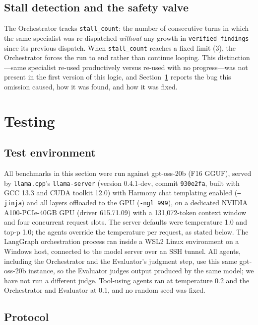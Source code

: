 \documentclass[conference]{IEEEtran}
\begin{document}
\subsection{Stall detection and the safety valve}
\label{sec:stall}

The Orchestrator tracks \texttt{stall\_count}: the number of consecutive
turns in which the same specialist was re-dispatched \emph{without} any
growth in \texttt{verified\_findings} since its previous dispatch. When
\texttt{stall\_count} reaches a fixed limit (3), the Orchestrator forces the
run to end rather than continue looping. This distinction---same
specialist re-used productively versus re-used with no progress---was not
present in the first version of this logic, and Section~\ref{sec:testing}
reports the bug this omission caused, how it was found, and how it was
fixed.

\section{Testing}
\label{sec:testing}

\subsection{Test environment}

All benchmarks in this section were run against gpt-oss-20b (F16 GGUF),
served by \texttt{llama.cpp}'s \texttt{llama-server} (version 0.4.1-dev,
commit \texttt{930e2fa}, built with GCC 13.3 and CUDA toolkit 12.0) with Harmony
chat templating enabled (\texttt{--jinja}) and all layers offloaded to the GPU
(\texttt{-ngl 999}), on a dedicated NVIDIA A100-PCIe-40GB GPU (driver 615.71.09)
with a 131{,}072-token context window and four concurrent request slots.
The server defaults were temperature 1.0 and top-p 1.0; the agents override
the temperature per request, as stated below. The
LangGraph orchestration process ran inside a WSL2 Linux environment on a
Windows host, connected to the model server over an SSH tunnel. All agents,
including the Orchestrator and the Evaluator's judgment step, use this same
gpt-oss-20b instance, so the Evaluator judges output produced by the same
model; we have not run a different judge. Tool-using agents ran at
temperature 0.2 and the Orchestrator and Evaluator at 0.1, and no random seed was
fixed.

\subsection{Protocol}
\end{document}
